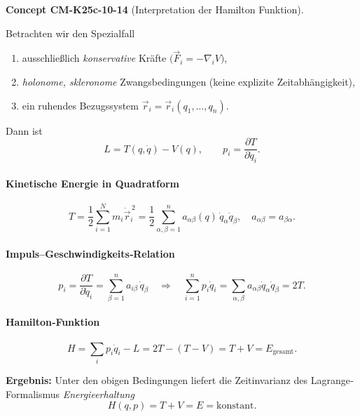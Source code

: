 \documentclass[10pt, letterpaper]{article}
\newcommand{\CustomHeading}[3]{%
  \par\medskip\noindent%
  \textbf{#1 #2} \textnormal{(#3)}.\enskip%
}
\newenvironment{CONC}[2]{\CustomHeading{Concept}{#1}{#2}}{}
\begin{document}
\begin{CONC}{CM-K25c-10-14}{Interpretation der Hamilton Funktion}
Betrachten wir den Spezialfall

\begin{enumerate}[label=(\roman*), leftmargin=*]
\item ausschließlich \emph{konservative} Kräfte
      \(\bigl(\vec F_i=-\nabla_i V\bigr)\),
\item \emph{holonome, skleronome} Zwangsbedingungen
      (keine explizite Zeitabhängigkeit),
\item ein ruhendes Bezugssystem
      \(\vec r_i=\vec r_i(q_1,\dots,q_n)\).
\end{enumerate}

Dann ist
\[
  L=T(q,\dot q)-V(q),
  \qquad
  p_i=\frac{\partial T}{\partial\dot q_i}.
\]

\paragraph{Kinetische Energie in Quadratform}

\[
  T
  =\frac{1}{2}\sum_{i=1}^{N}m_i\dot{\vec r}_i^{\,2}
  =\frac{1}{2}\sum_{\alpha,\beta=1}^{n}
      a_{\alpha\beta}(q)\,\dot q_\alpha\dot q_\beta,
\quad
  a_{\alpha\beta}=a_{\beta\alpha}.
\]

\paragraph{Impuls–Geschwindigkeits‐Relation}

\[
  p_i
  =\frac{\partial T}{\partial\dot q_i}
  =\sum_{\beta=1}^{n} a_{i\beta}\,\dot q_\beta
  \quad\Longrightarrow\quad
  \sum_{i=1}^{n}p_i\dot q_i
  =\sum_{\alpha,\beta}a_{\alpha\beta}\dot q_\alpha\dot q_\beta
  =2T.
\]

\paragraph{Hamilton‐Funktion}

\[
  H
  =\sum_{i}p_i\dot q_i - L
  =2T-(T-V)=T+V
  =E_{\text{gesamt}}.
\]

\noindent
\textbf{Ergebnis:}  
Unter den obigen Bedingungen liefert die Zeitinvarianz des
Lagrange‐Formalismus \emph{Energieerhaltung}
\[
  \boxed{\;
    H(q,p)=T+V=E=\text{konstant}.
  \;}
\]
\end{CONC}
\end{document}
